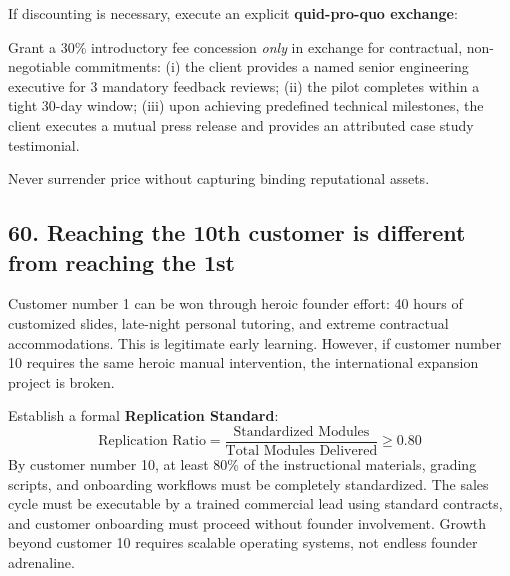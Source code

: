 If discounting is necessary, execute an explicit \textbf{quid-pro-quo exchange}:
\begin{tcolorbox}[colback=BayesCanvas,colframe=BayesSecondary,arc=1mm,title=\textbf{The Structured Concession Protocol}]
Grant a 30\% introductory fee concession \textit{only} in exchange for contractual, non-negotiable commitments: (i) the client provides a named senior engineering executive for 3 mandatory feedback reviews; (ii) the pilot completes within a tight 30-day window; (iii) upon achieving predefined technical milestones, the client executes a mutual press release and provides an attributed case study testimonial.
\end{tcolorbox}
Never surrender price without capturing binding reputational assets.

\subsection{60. Reaching the 10th customer is different from reaching the 1st}

Customer number 1 can be won through heroic founder effort: 40 hours of customized slides, late-night personal tutoring, and extreme contractual accommodations. This is legitimate early learning. However, if customer number 10 requires the same heroic manual intervention, the international expansion project is broken.

Establish a formal \textbf{Replication Standard}:
\begin{equation}
\text{Replication Ratio} = \frac{\text{Standardized Modules}}{\text{Total Modules Delivered}} \ge 0.80
\end{equation}
By customer number 10, at least 80\% of the instructional materials, grading scripts, and onboarding workflows must be completely standardized. The sales cycle must be executable by a trained commercial lead using standard contracts, and customer onboarding must proceed without founder involvement. Growth beyond customer 10 requires scalable operating systems, not endless founder adrenaline.
